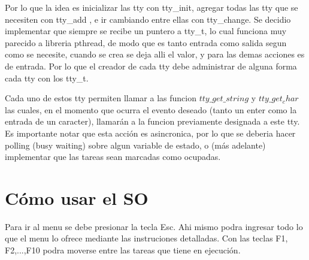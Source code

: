 \documentclass[a4paper,10pt]{article}
\begin{document}
Por lo que la idea es inicializar las tty con tty\_init, agregar todas las tty que se necesiten con tty\_add , e ir cambiando entre ellas con tty\_change. Se decidio implementar que siempre se recibe un puntero a tty\_t, lo cual funciona muy parecido a libreria pthread, de modo que es tanto entrada como salida segun como se necesite, cuando se crea se deja alli el valor, y para las demas acciones es de entrada. Por lo que el creador de cada tty debe administrar de alguna forma cada tty con los tty\_t.

Cada uno de estos tty permiten llamar a las funcion $tty\_get\_string$ y $tty\_get_char$ las cuales, en el momento que ocurra el evento deseado (tanto un enter como la entrada de un caracter), llamarán a la funcion previamente designada a este tty. Es importante notar que esta acción es asincronica, por lo que se deberia hacer polling (busy waiting) sobre algun variable de estado, o (más adelante) implementar que las tareas sean marcadas como ocupadas.

\newpage
\section{C\'omo usar el SO}
Para ir al menu se debe presionar la tecla Esc. Ahi mismo podra ingresar todo lo que el menu lo ofrece mediante las instruciones detalladas.
Con las teclas F1, F2,...,F10 podra moverse entre las tareas que tiene en ejecución.
\end{document}
